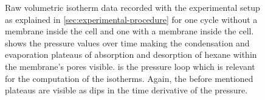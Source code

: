 \documentclass[../../../thesis.tex]{subfiles}
\begin{document}
\begin{figure}[ht]
{
          \label{subfig:vs_pressure}
          }
          \caption{Raw volumetric isotherm data recorded with the experimental setup
          as explained in \cref{sec:experimental-procedure} for one cycle without a
          membrane inside the cell and one with a membrane inside the cell.
          \protect{} shows the pressure values over time making
          the condensation and evaporation plateaus of absorption and desorption of
          hexane within the membrane's pores visible. \protect{} is
          the pressure loop which is relevant for the computation of the isotherms.
          Again, the before mentioned plateaus are visible as dips in the time
          derivative of the pressure.}
          \label{fig:raw-isotherms}
  \end{figure}
\end{document}
